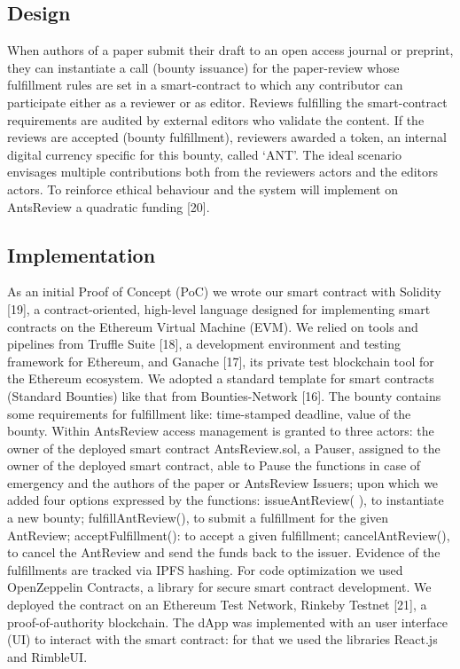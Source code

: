 \documentclass[runningheads]{llncs}
\begin{document}
\subsection{Design}
When authors of a paper submit their draft to an open access journal or preprint, they can instantiate a call (bounty issuance) for the paper-review whose fulfillment rules are set in a smart-contract to which any contributor can participate either as a reviewer or as editor. Reviews fulfilling the smart-contract requirements are audited by external editors who validate the content. If the reviews are accepted (bounty fulfillment), reviewers awarded a token, an internal digital currency specific for this bounty, called ‘ANT’. The ideal scenario envisages multiple contributions both from the reviewers actors and the editors actors. To reinforce ethical behaviour and the system will implement on AntsReview a quadratic funding [20].

\subsection{Implementation}
As an initial Proof of Concept (PoC) we wrote our smart contract with Solidity [19], a contract-oriented, high-level language designed for implementing smart contracts on the Ethereum Virtual Machine (EVM). We relied on tools and pipelines from Truffle Suite [18], a development environment and testing framework for Ethereum, and Ganache [17], its private test blockchain tool for the Ethereum ecosystem.
We adopted a standard template for smart contracts (Standard Bounties) like that from Bounties-Network [16]. The bounty contains some requirements for fulfillment like: time-stamped deadline, value of the bounty. Within AntsReview access management is granted to three actors: the owner of the deployed smart contract AntsReview.sol, a Pauser, assigned to the owner of the deployed smart contract, able to Pause the functions in case of emergency and the authors of the paper or AntsReview Issuers;   upon which we added four options expressed by the functions: issueAntReview( ), to instantiate a new bounty; fulfillAntReview(), to submit a fulfillment for the given AntReview; acceptFulfillment(): to accept a given fulfillment; cancelAntReview(), to cancel the AntReview and send the funds back to the issuer. Evidence of the fulfillments are tracked via  IPFS hashing.
For code optimization we used OpenZeppelin Contracts, a library for secure smart contract development. We deployed the contract on an Ethereum Test Network, Rinkeby Testnet [21], a proof-of-authority blockchain.
The dApp was implemented with an user interface (UI) to interact with the smart contract: for that we used the libraries React.js and RimbleUI.
\end{document}
